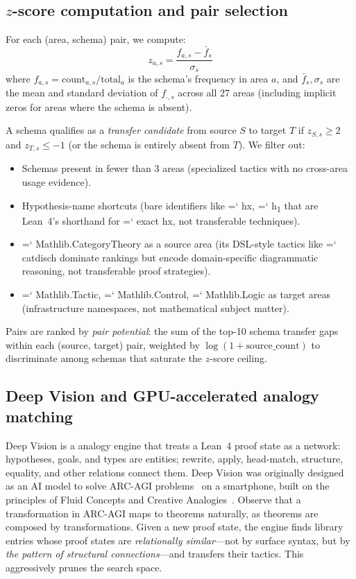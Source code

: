 \documentclass[11pt]{article}
\renewcommand{\texttt}[1]{%
  \begingroup\ttfamily\hyphenchar\font=`\-\relax
  \def\_{\textunderscore\discretionary{}{}{}}%
  #1\endgroup}
\theoremstyle{definition}
\theoremstyle{remark}
\begin{document}
\subsection{$z$-score computation and pair selection}

For each (area, schema) pair, we compute:
\[
z_{a,s} = \frac{f_{a,s} - \bar{f}_s}{\sigma_s}
\]
where $f_{a,s} = \text{count}_{a,s} / \text{total}_a$ is the schema's
frequency in area $a$, and $\bar{f}_s, \sigma_s$ are the mean and
standard deviation of $f_{\cdot,s}$ across all 27 areas (including
implicit zeros for areas where the schema is absent).

A schema qualifies as a \emph{transfer candidate} from source $S$ to
target $T$ if $z_{S,s} \geq 2$ and $z_{T,s} \leq -1$ (or the schema
is entirely absent from $T$).  We filter out:

\begin{itemize}
\item Schemas present in fewer than 3 areas (specialized tactics with
  no cross-area usage evidence).
\item Hypothesis-name shortcuts (bare identifiers like \texttt{hx},
  \texttt{h\textsubscript{1}} that are Lean~4's shorthand for
  \texttt{exact hx}, not transferable techniques).
\item \texttt{Mathlib.CategoryTheory} as a source area (its DSL-style
  tactics like \texttt{cat\_disch} dominate rankings but encode
  domain-specific diagrammatic reasoning, not transferable proof
  strategies).
\item \texttt{Mathlib.Tactic}, \texttt{Mathlib.Control},
  \texttt{Mathlib.Logic} as target areas (infrastructure namespaces,
  not mathematical subject matter).
\end{itemize}

Pairs are ranked by \emph{pair potential}: the sum of the top-10
schema transfer gaps within each (source, target) pair, weighted by
$\log(1 + \text{source\_count})$ to discriminate among schemas that
saturate the $z$-score ceiling.

\subsection{Deep Vision and GPU-accelerated analogy matching}\label{sec:matching}

Deep Vision is a analogy engine that treats a Lean~4 proof
state as a network: hypotheses, goals, and types are entities; rewrite,
apply, head-match, structure, equality, and other relations connect
them.  Deep Vision was originally designed as an AI model to solve
ARC-AGI problems~\cite{chollet2019} on a smartphone, built on the
principles of Fluid Concepts and Creative
Analogies~\cite{hofstadter_fluid_1995, hofstadter_go_1999}.  Observe that a
transformation in ARC-AGI maps to theorems naturally, as theorems are
composed by transformations.  Given a new proof state, the engine finds
library entries whose proof states are \emph{relationally similar}---not
by surface syntax, but by \emph{the pattern of structural
connections}---and transfers their tactics.  This aggressively prunes
the search space.
\end{document}
